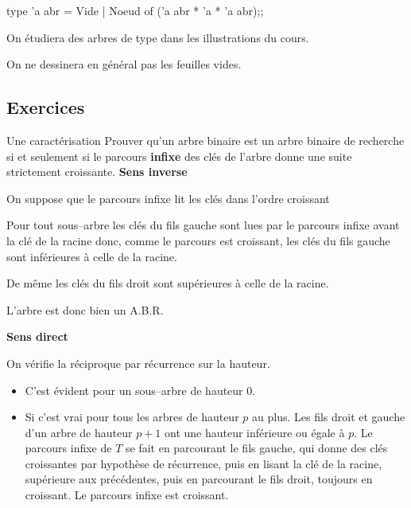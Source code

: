 \begin{ocaml}
type 'a abr = Vide | Noeud of ('a abr * 'a * 'a abr);; 
\end{ocaml} 
On étudiera des arbres de type  dans les illustrations du cours.

On ne dessinera en général pas les feuilles vides.
\subsection{Exercices}
\begin{exo}{Une caractérisation}{}
Prouver qu'un arbre binaire est un arbre binaire de recherche si et seulement si le parcours {\bf infixe} des clés de l'arbre donne une suite strictement croissante.
\reponse
{\bf Sens inverse}

On suppose que le parcours infixe lit les clés dans l'ordre croissant

Pour tout sous--arbre les clés du fils gauche sont lues par le parcours infixe avant la clé de la racine donc, comme le parcours est croissant, les clés du fils gauche sont inférieures à celle de la racine. 

De même les clés du fils droit sont supérieures à celle de la racine.

L'arbre est donc bien un A.B.R.

{\bf Sens direct}


On vérifie la réciproque par récurrence sur la hauteur.

\begin{itemize}
\item C'est évident pour un sous--arbre de hauteur 0.

\item Si c'est vrai pour tous les arbres de hauteur $p$ au plus.
Les  fils droit et gauche  d'un arbre de hauteur $p+1$ ont une hauteur inférieure ou égale à $p$. Le parcours infixe de $T$ se fait en parcourant le fils gauche, qui donne des clés croissantes par hypothèse de récurrence, puis en lisant la clé de la racine, supérieure aux précédentes, puis en parcourant le fils droit, toujours en croissant.
Le parcours infixe est croissant.

\end{itemize}
\end{exo}
